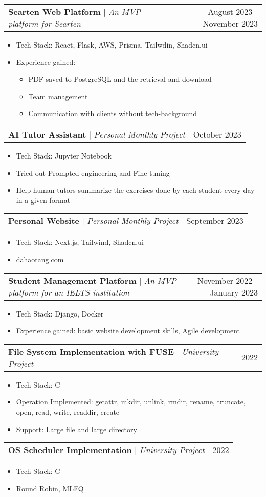 \documentclass[letterpaper,11pt]{article}
\makeatletter
\newcommand{\resumeItem}[1]{
    \item\small{
        {#1 \vspace{-2pt}}
    }
}
\newcommand{\resumeProjectHeading}[2]{
    \item
    \begin{tabular*}{0.97\textwidth}{l@{\extracolsep{\fill}}r}
        \small#1 & #2 \\
    \end{tabular*}\vspace{-7pt}
}
\newcommand{\resumeItemListStart}{\begin{itemize}}
\newcommand{\resumeItemListEnd}{\end{itemize}\vspace{-5pt}}
\makeatother
\begin{document}
        \resumeProjectHeading
        {\textbf{Searten Web Platform} $|$ \footnotesize\emph{An MVP platform for Searten}}{August 2023 - November 2023}
        \resumeItemListStart
            \resumeItem{Tech Stack: React, Flask, AWS, Prisma, Tailwdin, Shadcn.ui}
            \resumeItem{Experience gained:}
            \resumeItemListStart
                \resumeItem{PDF saved to PostgreSQL and the retrieval and download}
                \resumeItem{Team management}
                \resumeItem{Communication with clients without tech-background}
            \resumeItemListEnd
        \resumeItemListEnd

        \resumeProjectHeading
        {\textbf{AI Tutor Assistant} $|$ \footnotesize\emph{Personal Monthly Project}}{October 2023}
        \resumeItemListStart
            \resumeItem{Tech Stack: Jupyter Notebook}
            \resumeItem{Tried out Prompted engineering and Fine-tuning}
            \resumeItem{Help human tutors summarize the exercises done by each student every day in a given format}
        \resumeItemListEnd

        \resumeProjectHeading
        {\textbf{Personal Website} $|$ \footnotesize\emph{Personal Monthly Project}}{September 2023}
        \resumeItemListStart
            \resumeItem{Tech Stack: Next.js, Tailwind, Shadcn.ui}
            \resumeItem{\href{https://dahaotang.com}{\underline{dahaotang.com}}}
        \resumeItemListEnd

        \resumeProjectHeading
        {\textbf{Student Management Platform} $|$ \footnotesize\emph{An MVP platform for an IELTS institution}}{November 2022 - January 2023}
        \resumeItemListStart
            \resumeItem{Tech Stack: Django, Docker}
            \resumeItem{Experience gained: basic website development skills, Agile development}
        \resumeItemListEnd

        \resumeProjectHeading
        {\textbf{File System Implementation with FUSE} $|$ \footnotesize\emph{University Project}}{2022}
        \resumeItemListStart
            \resumeItem{Tech Stack: C}
            \resumeItem{Operation Implemented: getattr, mkdir, unlink, rmdir, rename, truncate, open, read, write, readdir, create}
            \resumeItem{Support: Large file and large directory}
        \resumeItemListEnd

        \resumeProjectHeading
        {\textbf{OS Scheduler Implementation} $|$ \footnotesize\emph{University Project}}{2022}
        \resumeItemListStart
            \resumeItem{Tech Stack: C}
            \resumeItem{Round Robin, MLFQ}
        \resumeItemListEnd
\end{document}
